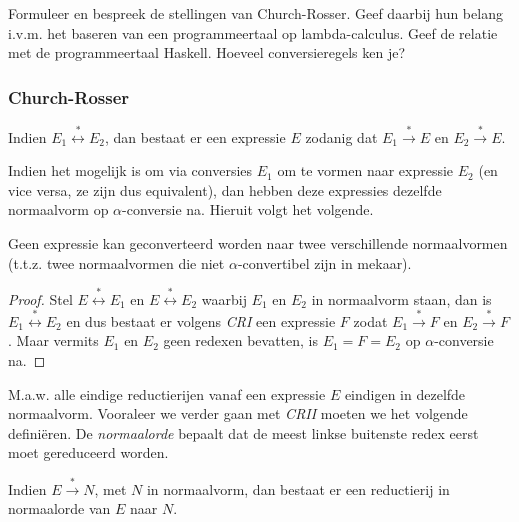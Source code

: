 \begin{quest}
	Formuleer en bespreek de stellingen van Church-Rosser. Geef daarbij hun belang i.v.m. het baseren van een programmeertaal op lambda-calculus. Geef de relatie met de programmeertaal Haskell. Hoeveel conversieregels ken je?
\end{quest}

\subsubsection*{Church-Rosser}

\begin{theorem}
	Indien $E_1 \stackrel{*}{\longleftrightarrow} E_2$, dan bestaat er een expressie $E$ zodanig dat $E_1 \stackrel{*}{\longrightarrow} E$ en $E_2 \stackrel{*}{\longrightarrow} E$.
\end{theorem}

Indien het mogelijk is om via conversies $E_1$ om te vormen naar expressie $E_2$ (en vice versa, ze zijn dus equivalent), dan hebben deze expressies dezelfde normaalvorm op $\alpha$-conversie na. Hieruit volgt het volgende.

\begin{theorem}
	Geen expressie kan geconverteerd worden naar twee verschillende normaalvormen (t.t.z. twee normaalvormen die niet $\alpha$-convertibel zijn in mekaar).
\end{theorem}

\begin{proof}
	Stel $E \stackrel{*}{\longleftrightarrow} E_1$ en $E \stackrel{*}{\longleftrightarrow} E_2$ waarbij $E_1$ en $E_2$ in normaalvorm staan, dan is $E_1 \stackrel{*}{\longleftrightarrow} E_2$ en dus bestaat er volgens \emph{CRI} een expressie $F$ zodat $E_1 \stackrel{*}{\longrightarrow} F$ en $E_2 \stackrel{*}{\longrightarrow} F$. Maar vermits $E_1$ en $E_2$ geen redexen bevatten, is $E_1 = F = E_2$ op $\alpha$-conversie na.
\end{proof}
M.a.w. alle eindige reductierijen vanaf een expressie $E$ eindigen in dezelfde normaalvorm. Vooraleer we verder gaan met \emph{CRII} moeten we het volgende defini\"eren. De \emph{normaalorde} bepaalt dat de meest linkse buitenste redex eerst moet gereduceerd worden.

\begin{theorem}
	Indien $E \stackrel{*}{\longrightarrow} N$, met $N$ in normaalvorm, dan bestaat er een reductierij in normaalorde van $E$ naar $N$.
\end{theorem}

